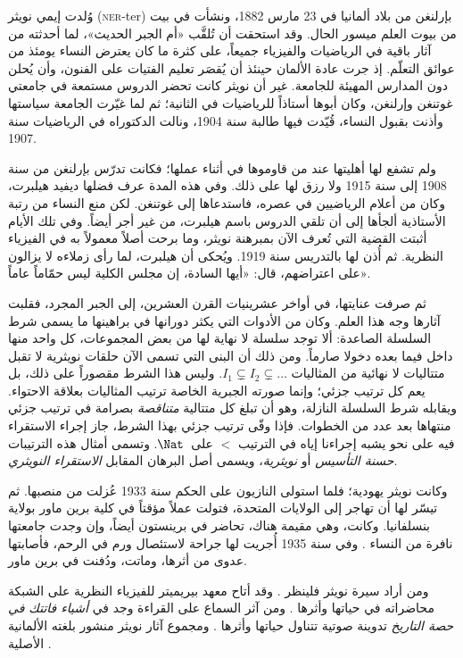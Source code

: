 \documentclass[../../../include/open-logic-section]{subfiles}
\begin{document}



وُلدت إيمي نويثر (\textsc{ner}-ter) بإرلنغن من بلاد ألمانيا في 23 مارس
1882، ونشأت في بيت من بيوت العلم ميسور الحال. وقد استحقت أن تُلقَّب «أم
الجبر الحديث»، لما أحدثته من آثار باقية في الرياضيات والفيزياء جميعاً،
على كثرة ما كان يعترض النساء يومئذ من عوائق التعلّم. إذ جرت عادة الألمان
حينئذ أن يُقصَر تعليم الفتيات على الفنون، وأن يُحلن دون المدارس المهيئة
للجامعة. غير أن نويثر كانت تحضر الدروس مستمعة في جامعتي غوتنغن وإرلنغن،
وكان أبوها أستاذاً للرياضيات في الثانية؛ ثم لما غيّرت الجامعة سياستها
وأذنت بقبول النساء، قُيّدت فيها طالبة سنة 1904، ونالت الدكتوراه في
الرياضيات سنة 1907.

ولم تشفع لها أهليتها عند من قاوموها في أثناء عملها؛ فكانت تدرّس بإرلنغن
من سنة 1908 إلى سنة 1915 ولا رزق لها على ذلك. وفي هذه المدة عرف فضلها
ديفيد هيلبرت، وكان من أعلام الرياضيين في عصره، فاستدعاها إلى غوتنغن. لكن
منع النساء من رتبة الأستاذية ألجأها إلى أن تلقي الدروس باسم هيلبرت، من غير
أجر أيضاً. وفي تلك الأيام أثبتت القضية التي تُعرف الآن بمبرهنة نويثر، وما
برحت أصلاً معمولاً به في الفيزياء النظرية. ثم أُذن لها بالتدريس سنة 1919.
ويُحكى أن هيلبرت، لما رأى زملاءه لا يزالون على اعتراضهم، قال: «أيها
السادة، إن مجلس الكلية ليس حمّاماً عاماً».

ثم صرفت عنايتها، في أواخر عشرينيات القرن العشرين، إلى الجبر المجرد، فقلبت
آثارها وجه هذا العلم. وكان من الأدوات التي يكثر دورانها في براهينها ما
يسمى شرط السلسلة الصاعدة: ألا توجد سلسلة لا نهاية لها من بعض المجموعات،
كل واحد منها داخل فيما بعده دخولا صارماً. ومن ذلك أن البنى التي تسمى الآن
حلقات نويثرية لا تقبل متتاليات لا نهائية من المثاليات
$I_1 \subsetneq I_2 \subsetneq \dots$. وليس هذا الشرط مقصوراً على ذلك،
بل يعم كل ترتيب جزئي؛ وإنما صورته الجبرية الخاصة ترتيب المثاليات بعلاقة
الاحتواء. ويقابله شرط السلسلة النازلة، وهو أن تبلغ كل متتالية
\emph{متناقصة} بصرامة في ترتيب جزئي منتهاها بعد عدد من الخطوات. فإذا وفّى
ترتيب جزئي بهذا الشرط، جاز إجراء الاستقراء فيه على نحو يشبه إجراءنا إياه
في الترتيب $<$ على~$\Nat$. وتسمى أمثال هذه الترتيبات \emph{حسنة
التأسيس} أو \emph{نويثرية}، ويسمى أصل البرهان المقابل \emph{الاستقراء
النويثري}.

وكانت نويثر يهودية؛ فلما استولى النازيون على الحكم سنة 1933 عُزلت من
منصبها. ثم تيسّر لها أن تهاجر إلى الولايات المتحدة، فتولت عملاً مؤقتاً في
كلية برين ماور بولاية بنسلفانيا. وكانت، وهي مقيمة هناك، تحاضر في برينستون
أيضاً، وإن وجدت جامعتها نافرة من النساء \citep[81]{Dick1981}. وفي سنة
1935 أُجريت لها جراحة لاستئصال ورم في الرحم، فأصابتها عدوى من أثرها،
وماتت، ودُفنت في برين ماور.

\begin{reading}
ومن أراد سيرة نويثر فلينظر \citet{Dick1981}. وقد أتاح معهد بيريميتر
للفيزياء النظرية على الشبكة محاضراته في حياتها وأثرها
\citep{Perimeter2015}. ومن آثر السماع على القراءة وجد في \emph{أشياء
فاتتك في حصة التاريخ} تدوينة صوتية تتناول حياتها وأثرها
\citep{Frey2015}. ومجموع آثار نويثر منشور بلغته الألمانية الأصلية
\citep{Noether1983}.
\end{reading}
\end{document}

